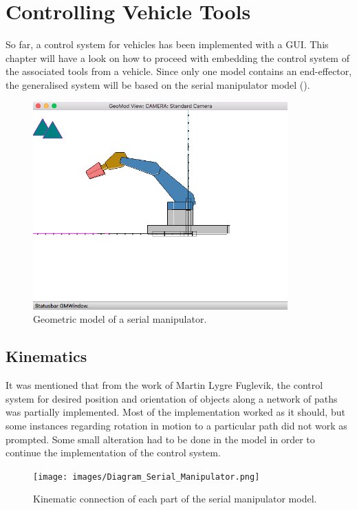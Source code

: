 \chapter{Controlling Vehicle Tools}

So far, a control system for vehicles has been implemented with a GUI. This chapter will have a look on how to proceed with embedding the control system of the associated tools from a vehicle. Since only one model contains an end-effector, the generalised system will be based on the serial manipulator model ().

\begin{figure}[ht]
    \centering
    \includegraphics[height=8cm]{images/GeometricModel.png}
    \caption[Geometric model of a serial manipulator]{Geometric model of a serial manipulator.}
    \label{fig:SerialManipulator}
\end{figure}

\section{Kinematics}

It was mentioned that from the work of Martin Lygre Fuglevik, the control system for desired position and orientation of objects along a network of paths was partially implemented. Most of the implementation worked as it should, but some instances regarding rotation in motion to a particular path did not work as prompted. Some small alteration had to be done in the model in order to continue the implementation of the control system. 

\begin{figure}[ht]
    \centering
    \texttt{[image: images/Diagram\_Serial\_Manipulator.png]}
    \caption[Kinematic connection of each part of the serial manipulator model]{Kinematic connection of each part of the serial manipulator model.}
    \label{fig:KinematicsSerialManipulator}
\end{figure}


